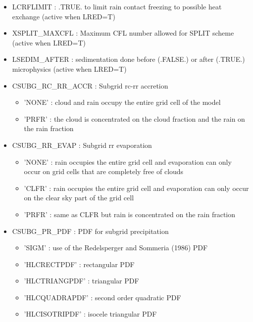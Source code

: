 \begin{itemize}
\item 
LCRFLIMIT  : .TRUE. to limit rain contact freezing to possible heat exchange (active when LRED=T)

\item 
XSPLIT\_MAXCFL : Maximum CFL number allowed for SPLIT scheme (active when LRED=T)

\item 
LSEDIM\_AFTER  : sedimentation done before (.FALSE.) or after (.TRUE.) microphysics (active when LRED=T)

\item
CSUBG\_RC\_RR\_ACCR :
Subgrid rc-rr accretion
\begin{itemize}
\item{'NONE'} : cloud and rain occupy the entire grid cell of the model
\item{'PRFR'} : the cloud is concentrated on the cloud fraction and the rain on the rain fraction
\end{itemize}

\item
CSUBG\_RR\_EVAP :
Subgrid rr evaporation
\begin{itemize}
\item{'NONE'} : rain occupies the entire grid cell and evaporation can only occur on grid cells that are completely free of clouds
\item{'CLFR'} : rain occupies the entire grid cell and evaporation can only occur on the clear sky part of the grid cell
\item{'PRFR'} : same as CLFR but rain is concentrated on the rain fraction
\end{itemize}

\item
CSUBG\_PR\_PDF :
PDF for subgrid precipitation
\begin{itemize}
\item{'SIGM'} : use of the Redelsperger and Sommeria (1986) PDF 
\item{'HLCRECTPDF'} : rectangular PDF
\item{'HLCTRIANGPDF'} : triangular PDF
\item{'HLCQUADRAPDF'} : second order quadratic PDF
\item{'HLCISOTRIPDF'} : isocele triangular PDF
\end{itemize}

\end{itemize}
